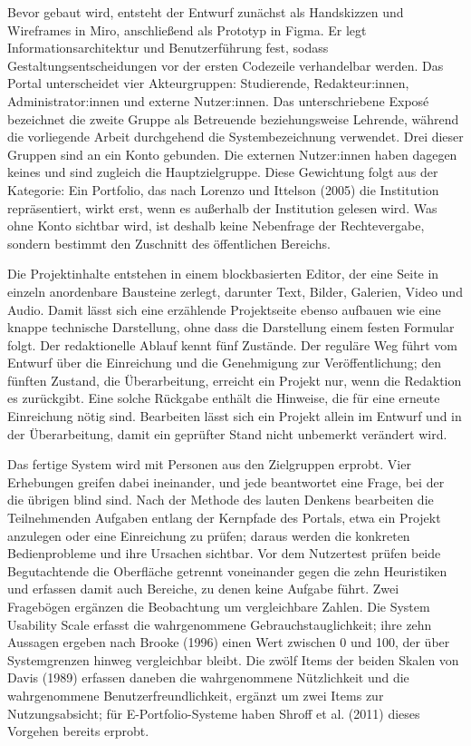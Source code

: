 Bevor gebaut wird, entsteht der Entwurf zunächst als Handskizzen und Wireframes in Miro, anschließend als Prototyp in Figma. Er legt Informationsarchitektur und Benutzerführung fest, sodass Gestaltungsentscheidungen vor der ersten Codezeile verhandelbar werden. Das Portal unterscheidet vier Akteurgruppen: Studierende, Redakteur:innen, Administrator:innen und externe Nutzer:innen. Das unterschriebene Exposé bezeichnet die zweite Gruppe als Betreuende beziehungsweise Lehrende, während die vorliegende Arbeit durchgehend die Systembezeichnung verwendet. Drei dieser Gruppen sind an ein Konto gebunden. Die externen Nutzer:innen haben dagegen keines und sind zugleich die Hauptzielgruppe. Diese Gewichtung folgt aus der Kategorie: Ein Portfolio, das nach Lorenzo und Ittelson (2005) die Institution repräsentiert, wirkt erst, wenn es außerhalb der Institution gelesen wird. Was ohne Konto sichtbar wird, ist deshalb keine Nebenfrage der Rechtevergabe, sondern bestimmt den Zuschnitt des öffentlichen Bereichs.

Die Projektinhalte entstehen in einem blockbasierten Editor, der eine Seite in einzeln anordenbare Bausteine zerlegt, darunter Text, Bilder, Galerien, Video und Audio. Damit lässt sich eine erzählende Projektseite ebenso aufbauen wie eine knappe technische Darstellung, ohne dass die Darstellung einem festen Formular folgt. Der redaktionelle Ablauf kennt fünf Zustände. Der reguläre Weg führt vom Entwurf über die Einreichung und die Genehmigung zur Veröffentlichung; den fünften Zustand, die Überarbeitung, erreicht ein Projekt nur, wenn die Redaktion es zurückgibt. Eine solche Rückgabe enthält die Hinweise, die für eine erneute Einreichung nötig sind. Bearbeiten lässt sich ein Projekt allein im Entwurf und in der Überarbeitung, damit ein geprüfter Stand nicht unbemerkt verändert wird.

Das fertige System wird mit Personen aus den Zielgruppen erprobt. Vier Erhebungen greifen dabei ineinander, und jede beantwortet eine Frage, bei der die übrigen blind sind. Nach der Methode des lauten Denkens bearbeiten die Teilnehmenden Aufgaben entlang der Kernpfade des Portals, etwa ein Projekt anzulegen oder eine Einreichung zu prüfen; daraus werden die konkreten Bedienprobleme und ihre Ursachen sichtbar. Vor dem Nutzertest prüfen beide Begutachtende die Oberfläche getrennt voneinander gegen die zehn Heuristiken und erfassen damit auch Bereiche, zu denen keine Aufgabe führt. Zwei Fragebögen ergänzen die Beobachtung um vergleichbare Zahlen. Die System Usability Scale erfasst die wahrgenommene Gebrauchstauglichkeit; ihre zehn Aussagen ergeben nach Brooke (1996) einen Wert zwischen 0 und 100, der über Systemgrenzen hinweg vergleichbar bleibt. Die zwölf Items der beiden Skalen von Davis (1989) erfassen daneben die wahrgenommene Nützlichkeit und die wahrgenommene Benutzerfreundlichkeit, ergänzt um zwei Items zur Nutzungsabsicht; für E-Portfolio-Systeme haben Shroff et al. (2011) dieses Vorgehen bereits erprobt.

